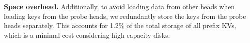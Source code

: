 \noindent \textbf{Space overhead.} 
Additionally, to avoid loading data from other heads when loading keys from the probe heads, we redundantly store the keys from the probe heads separately. 
This accounts for 1.2\% of the total storage of all prefix KVs, which is a minimal cost considering high-capacity disks.


